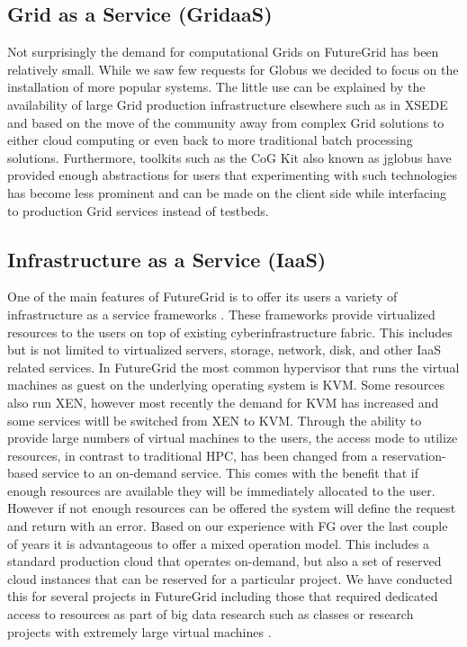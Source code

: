\documentclass{article}
\begin{document}
\subsection{Grid as a Service (GridaaS)}

Not surprisingly the demand for computational Grids on FutureGrid has been relatively small. While we saw few requests for Globus we decided to focus on the installation of more popular systems. The little use can be explained by the availability of large Grid production infrastructure elsewhere such as in XSEDE and based on the move of the community away from complex Grid solutions to either cloud computing or even back to more traditional batch processing solutions. Furthermore, toolkits such as the CoG Kit also known as jglobus \cite{las05workflow-jgc,las01cog-concurency,las06-workflow-book} have provided enough abstractions for users that experimenting with such technologies has become less prominent and can be made on the client side while interfacing to production Grid services instead of testbeds. 

\subsection{Infrastructure as a Service (IaaS)}

One of the main features of FutureGrid is to offer its users a variety of infrastructure as a service frameworks \cite{comparisoncloud,las2011virt}. These frameworks provide virtualized resources to the users on top of existing cyberinfrastructure fabric. This includes but is not limited to virtualized servers, storage, network, disk, and other IaaS related services. In FutureGrid the most common hypervisor that runs the virtual machines as guest on the underlying operating system is KVM. Some resources also run XEN, however most recently the demand for KVM has increased and some services witll be switched from XEN to KVM. Through the ability to provide large numbers of virtual machines to the users, the access mode to utilize resources, in contrast to traditional HPC, has been changed from a reservation-based service to an on-demand service. This comes with the benefit that if enough resources are available they will be immediately allocated to the user. However if not enough resources can be offered the system will define the request and return with an error. Based on our experience with FG over the last couple of years it is advantageous to offer a mixed operation model. This includes a standard production cloud that operates on-demand, but also a set of reserved cloud instances that can be reserved for a particular project. We have conducted this for several projects in FutureGrid including those that required dedicated access to resources as part of big data research such as classes \cite{fg405,fg368} or research projects with extremely large virtual machines \cite{fg298}.
\end{document}

